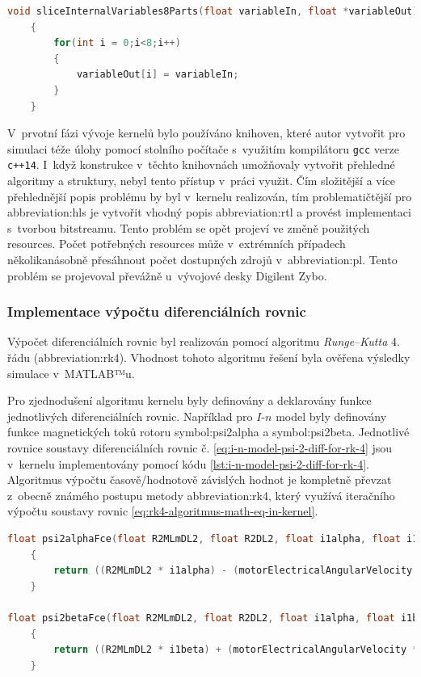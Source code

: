 \documentclass[a4paper, twoside, 11pt]{article}
\begin{document}
		\begin{lstlisting}[language={c++}, caption={Slice funkce pro kopírování proměnné variableIn do pole variableOut s~osmi polohami.}, label={lst:slice-function-8-parts}]
void sliceInternalVariables8Parts(float variableIn, float *variableOut)
	{
		for(int i = 0;i<8;i++)
		{
			variableOut[i] = variableIn;
		}
	}\end{lstlisting}
	V~prvotní fázi vývoje kernelů bylo používáno knihoven, které autor vytvořit pro simulaci téže úlohy pomocí stolního počítače s~využitím kompilátoru \texttt{gcc} verze \texttt{c++14}. I~když konstrukce v~těchto knihovnách umožňovaly vytvořit přehledné algoritmy a struktury, nebyl tento přístup v~práci využit. Čím složitější a více přehlednější popis problému by byl v~kernelu realizován, tím problematičtější pro \gls{abbreviation:hls} je vytvořit vhodný popis \gls{abbreviation:rtl} a provést implementaci s~tvorbou bitstreamu. Tento problém se opět projeví ve změně použitých resources. Počet potřebných resources může v~extrémních případech několikanásobně přesáhnout počet dostupných zdrojů v~\gls{abbreviation:pl}. Tento problém se projevoval převážně u~vývojové desky Digilent Zybo.\par

			\subsubsection{Implementace výpočtu diferenciálních rovnic}\label{subsubsec:implementace-vypoctu-diferencialnich-rovnic}
		Výpočet diferenciálních rovnic byl realizován pomocí algoritmu \textit{Runge–Kutta} 4. řádu (\gls{abbreviation:rk4}). Vhodnost tohoto algoritmu řešení byla ověřena výsledky simulace v~MATLAB™u.\par
		Pro zjednodušení algoritmu kernelu byly definovány a deklarovány funkce jednotlivých diferenciálních rovnic. Například pro $I$-$n$ model byly definovány funkce magnetických toků rotoru \gls{symbol:psi2alpha} a \gls{symbol:psi2beta}. Jednotlivé rovnice soustavy diferenciálních rovnic č. \ref{eq:i-n-model-psi-2-diff-for-rk-4} jsou v~kernelu implementovány pomocí kódu \ref{lst:i-n-model-psi-2-diff-for-rk-4}. Algoritmus výpočtu časově/hodnotově závislých hodnot je kompletně převzat z~obecně známého postupu metody \gls{abbreviation:rk4}, který využívá iteračního výpočtu soustavy rovnic \ref{eq:rk4-algoritmus-math-eq-in-kernel}.

		\begin{lstlisting}[language={c++}, caption={Implementace diferenciálních rovnic č. \ref{eq:i-n-model-psi-2-diff-for-rk-4} do algoritmu kernelu.}, label={lst:i-n-model-psi-2-diff-for-rk-4}]
float psi2alphaFce(float R2MLmDL2, float R2DL2, float i1alpha, float i1beta, float psi2alpha, float psi2beta, float motorElectricalAngularVelocity)
	{
		return ((R2MLmDL2 * i1alpha) - (motorElectricalAngularVelocity * psi2beta) - (R2DL2 * psi2alpha));
	}

float psi2betaFce(float R2MLmDL2, float R2DL2, float i1alpha, float i1beta, float psi2alpha, float psi2beta, float motorElectricalAngularVelocity)
    {
        return ((R2MLmDL2 * i1beta) + (motorElectricalAngularVelocity * psi2alpha) - (R2DL2 * psi2beta));
    }\end{lstlisting}
\end{document}

